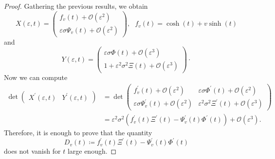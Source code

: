 \documentclass[10pt,a4paper]{amsart}
\begin{document}
\begin{proof}
    Gathering the previous results, we obtain
    \begin{equation*}
        X(\varepsilon,t) = \begin{pmatrix}
            f_v(t) + \mathcal{O}(\varepsilon^2) \\ \varepsilon \sigma \Psi_v(t) + \mathcal{O}(\varepsilon^2)
        \end{pmatrix}, ~~~ f_v(t) = \cosh(t) + v \sinh(t)
    \end{equation*}
    and 
    \begin{equation*}
        Y(\varepsilon,t) = \begin{pmatrix}
            \varepsilon \sigma \Phi(t) + \mathcal{O}(\varepsilon^3) \\ 1 +\varepsilon^2 \sigma^2 \Xi(t) + \mathcal{O}(\varepsilon^3)
        \end{pmatrix} \cdot
    \end{equation*}
    Now we can compute
    \begin{align*}
        \det \begin{pmatrix} X^\prime(\varepsilon,t) & Y^\prime(\varepsilon,t) \end{pmatrix} & = \det \begin{pmatrix}
            f^\prime_v(t) + \mathcal{O}(\varepsilon^2) & \varepsilon \sigma \Phi^\prime(t) + \mathcal{O}(\varepsilon^2) \\ \varepsilon \sigma \Psi_v^\prime(t) + \mathcal{O}(\varepsilon^2) & \varepsilon^2 \sigma^2 \Xi^\prime(t) + \mathcal{O}(\varepsilon^3) 
        \end{pmatrix} \\
        & = \varepsilon^2 \sigma^2 (f^\prime_v(t) \Xi^\prime(t)-\Psi^\prime_v(t) \Phi^\prime(t)) + \mathcal{O}(\varepsilon^3) .
    \end{align*}
    Therefore, it is enough to prove that the quantity 
    \begin{equation*}
        D_v(t) \coloneqq f^\prime_v(t) \Xi^\prime(t)-\Psi^\prime_v(t) \Phi^\prime(t)
    \end{equation*}
    does not vanish for $t$ large enough. 


\end{proof}
\end{document}
